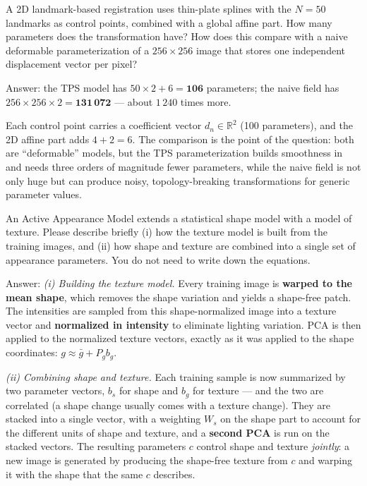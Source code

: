 \documentclass[11pt]{exam}
\newcommand{\answerspace}[1]{\ifprintanswers\else\vspace{#1}\fi}
\begin{document}
\begin{questions}
\question
A 2D landmark-based registration uses thin-plate splines with the $N = 50$ landmarks as control
points, combined with a global affine part. How many parameters does the transformation have? How
does this compare with a naive deformable parameterization of a $256 \times 256$ image that stores
one independent displacement vector per pixel?

\begin{solution}
  Answer: the TPS model has $50 \times 2 + 6 = \mathbf{106}$ parameters; the naive field has
  $256 \times 256 \times 2 = \mathbf{131\,072}$ --- about $1\,240$ times more.

  Each control point carries a coefficient vector $d_n \in \mathbb{R}^2$ (100 parameters), and the
  2D affine part adds $4 + 2 = 6$. The comparison is the point of the question: both are
  ``deformable'' models, but the TPS parameterization builds smoothness in and needs three orders
  of magnitude fewer parameters, while the naive field is not only huge but can produce noisy,
  topology-breaking transformations for generic parameter values.
\end{solution}
\answerspace{3.6cm}

\question
An Active Appearance Model extends a statistical shape model with a model of texture. Please
describe briefly (i) how the texture model is built from the training images, and (ii) how shape
and texture are combined into a single set of appearance parameters. You do not need to write down
the equations.

\begin{solution}
  Answer: \emph{(i) Building the texture model.} Every training image is \textbf{warped to the mean
  shape}, which removes the shape variation and yields a shape-free patch. The intensities are
  sampled from this shape-normalized image into a texture vector and \textbf{normalized in
  intensity} to eliminate lighting variation. PCA is then applied to the normalized texture
  vectors, exactly as it was applied to the shape coordinates: $g \approx \bar g + P_g b_g$.

  \emph{(ii) Combining shape and texture.} Each training sample is now summarized by two parameter
  vectors, $b_s$ for shape and $b_g$ for texture --- and the two are correlated (a shape change
  usually comes with a texture change). They are stacked into a single vector, with a weighting
  $W_s$ on the shape part to account for the different units of shape and texture, and a
  \textbf{second PCA} is run on the stacked vectors. The resulting parameters $c$ control shape and
  texture \emph{jointly}: a new image is generated by producing the shape-free texture from $c$ and
  warping it with the shape that the same $c$ describes.


\end{solution}
\end{questions}
\end{document}
